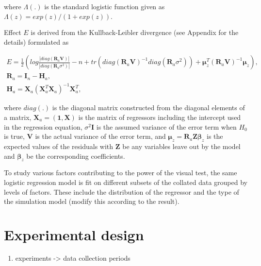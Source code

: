 \documentclass[]{interact}
\theoremstyle{plain}%
\theoremstyle{definition}
\theoremstyle{remark}
\providecommand{\tightlist}{%
  \setlength{\itemsep}{0pt}\setlength{\parskip}{0pt}}
\def\tightlist{}
\begin{document}
\noindent where \(\Lambda(.)\) is the standard logistic function given
as \(\Lambda(z) = exp(z)/(1+exp(z))\).

Effect \(E\) is derived from the Kullback-Leibler divergence (see
Appendix for the details) formulated as

\small

\begin{gather}  \label{eq:effect-size}
E = \frac{1}{2}\left(log\frac{|diag(\boldsymbol{R}_a\boldsymbol{V})|}{|diag(\boldsymbol{R}_a\sigma^2)|} - n + tr(diag(\boldsymbol{R}_a\boldsymbol{V})^{-1}diag(\boldsymbol{R}_a\sigma^2)) + \boldsymbol{\mu}_z^{T}(\boldsymbol{R}_a\boldsymbol{V})^{-1}\boldsymbol{\mu}_z\right),\\
\boldsymbol{R}_a = \boldsymbol{I}_n - \boldsymbol{H}_a,\\
\boldsymbol{H}_a = \boldsymbol{X}_a(\boldsymbol{X}_a^T\boldsymbol{X}_a)^{-1}\boldsymbol{X}_a^T,
\end{gather}

\normalsize

\noindent where \(diag(.)\) is the diagonal matrix constructed from the
diagonal elements of a matrix,
\(\boldsymbol{X}_a = (\boldsymbol{1}, \boldsymbol{X})\) is the matrix of
regressors including the intercept used in the regression equation,
\(\sigma^2\boldsymbol{I}\) is the assumed variance of the error term
when \(H_0\) is true, \(\boldsymbol{V}\) is the actual variance of the
error term, and
\(\boldsymbol{\mu}_z = \boldsymbol{R}_a\boldsymbol{Z}\boldsymbol{\beta}_z\)
is the expected values of the residuals with \(\boldsymbol{Z}\) be any
variables leave out by the model and \(\boldsymbol{\beta}_z\) be the
corresponding coefficients.

To study various factors contributing to the power of the visual test,
the same logistic regression model is fit on different subsets of the
collated data grouped by levels of factors. These include the
distribution of the regressor and the type of the simulation model
(modify this according to the result).

\hypertarget{experimental-design}{%
\section{Experimental design}\label{experimental-design}}

\begin{enumerate}
\def\labelenumi{\arabic{enumi}.}
\tightlist
\item
  experiments -\textgreater{} data collection periods
\end{enumerate}
\end{document}
